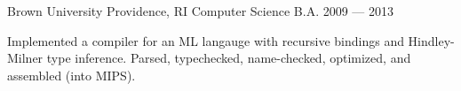\documentclass[11pt]{resume}
\begin{document}
\makecvheader[C]



  \begin{cventries}



      \begin{cventries}
        \cventry
        { Brown University }
        { Providence, RI }
        { Computer Science B.A. }
        { 2009 — 2013 }
        { \item { Implemented a compiler for an ML langauge with recursive bindings and Hindley-Milner type inference. Parsed, typechecked, name-checked, optimized, and assembled (into MIPS). } }
      \end{cventries}



  \end{cventries}


\end{document}
